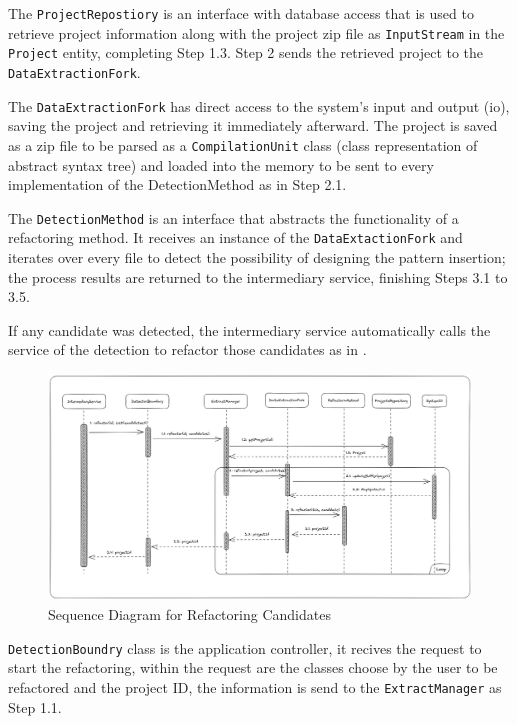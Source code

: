 The \texttt{ProjectRepostiory} is an interface with database access that is used to retrieve project information along with the project zip file as \texttt{InputStream} in the \texttt{Project} entity, completing Step 1.3. Step 2 sends the retrieved project to the \texttt{DataExtractionFork}.

The \texttt{DataExtractionFork} has direct access to the system's input and output (io), saving the project and retrieving it immediately afterward. The project is saved as a zip file to be parsed as a \texttt{CompilationUnit} class (class representation of abstract syntax tree) and loaded into the memory to be sent to every implementation of the DetectionMethod as in Step 2.1.

The \texttt{DetectionMethod} is an interface that abstracts the functionality of a refactoring method. It receives an instance of the \texttt{DataExtactionFork} and iterates over every file to detect the possibility of designing the pattern insertion; the process results are returned to the intermediary service, finishing Steps 3.1 to 3.5.

If any candidate was detected, the intermediary service automatically calls the service of the detection to refactor those candidates as in .

\begin{figure}[ht!]
\SetCaptionWidth{\textwidth}
\caption{Sequence Diagram for Refactoring Candidates}
\label{fig-refactoring}
\includegraphics[width=160mm]{Chapter-2/Figures/refactoring.png}
\end{figure}
\FloatBarrier

\texttt{DetectionBoundry} class is the application controller, it recives the request to start the refactoring, within the request are the classes choose by the user to be refactored and the project ID, the information is send to the \texttt{ExtractManager} as Step 1.1.


